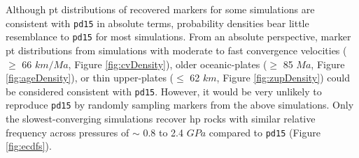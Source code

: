 Although \gls{pt} distributions of recovered markers for some simulations are consistent with \texttt{pd15} in absolute terms, probability densities bear little resemblance to \texttt{pd15} for most simulations. From an absolute perspective, marker \gls{pt} distributions from simulations with moderate to fast convergence velocities (\(\geq\) 66 \(km/Ma\), Figure \ref{fig:cvDensity}), older oceanic-plates (\(\geq\) 85 \(Ma\), Figure \ref{fig:ageDensity}), or thin upper-plates (\(\leq\) 62 \(km\), Figure \ref{fig:zupDensity}) could be considered consistent with \texttt{pd15}. However, it would be very unlikely to reproduce \texttt{pd15} by randomly sampling markers from the above simulations. Only the slowest-converging simulations recover \gls{hp} rocks with similar relative frequency across pressures of \(\sim\) 0.8 to 2.4 \(GPa\) compared to \texttt{pd15} (Figure \ref{fig:ecdfs}).



